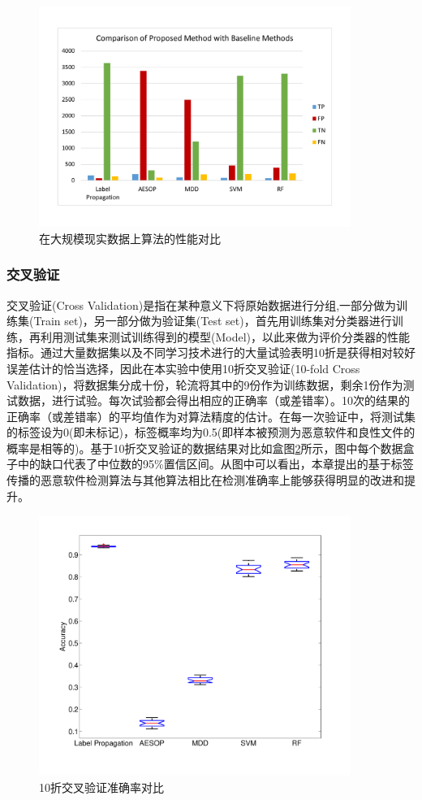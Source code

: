 \begin{figure}[!ht]
\centering
\includegraphics[width=4in]{img/chap2/ResultComparison.pdf}
\caption{在大规模现实数据上算法的性能对比}
\label{fig_ResComparisonWithBaseline}
\end{figure}

\subsubsection{交叉验证}
交叉验证(Cross Validation)是指在某种意义下将原始数据进行分组,一部分做为训练集(Train set)，另一部分做为验证集(Test set)，首先用训练集对分类器进行训练，再利用测试集来测试训练得到的模型(Model)，以此来做为评价分类器的性能指标。通过大量数据集以及不同学习技术进行的大量试验表明10折是获得相对较好误差估计的恰当选择，因此在本实验中使用10折交叉验证(10-fold Cross Validation)，将数据集分成十份，轮流将其中的9份作为训练数据，剩余1份作为测试数据，进行试验。每次试验都会得出相应的正确率（或差错率）。10次的结果的正确率（或差错率）的平均值作为对算法精度的估计。在每一次验证中，将测试集的标签设为0(即未标记)，标签概率均为0.5(即样本被预测为恶意软件和良性文件的概率是相等的)。基于10折交叉验证的数据结果对比如盒图\ref{fig_Boxplot}所示，图中每个数据盒子中的缺口代表了中位数的95\%置信区间。从图中可以看出，本章提出的基于标签传播的恶意软件检测算法与其他算法相比在检测准确率上能够获得明显的改进和提升。

\begin{figure}[!ht]
\centering
\includegraphics[width=4in]{img/chap2/Boxplot.pdf}
\caption{10折交叉验证准确率对比}
\label{fig_Boxplot}
\end{figure}

